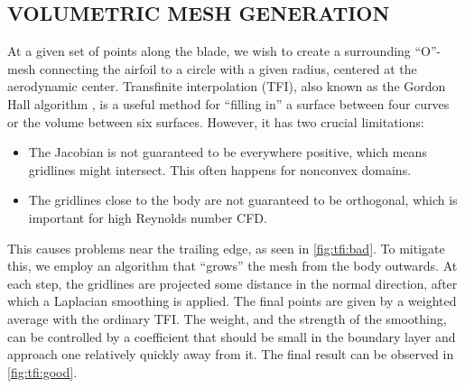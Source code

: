 \documentclass{nordic}
\begin{document}
\subsection{VOLUMETRIC MESH GENERATION}

At a given set of points along the blade, we wish to create a surrounding ``O''-mesh connecting the
airfoil to a circle with a given radius, centered at the aerodynamic center.  Transfinite
interpolation (TFI), also known as the Gordon Hall algorithm \cite{Gordon1973ccc}, is a useful method for
``filling in'' a surface between four curves or the volume between six surfaces.  However, it has
two crucial limitations:

\begin{itemize}
  \item The Jacobian is not guaranteed to be everywhere positive, which means gridlines might
    intersect.  This often happens for nonconvex domains.
  \item The gridlines close to the body are not guaranteed to be orthogonal, which is important for
    high Reynolds number CFD.
\end{itemize}

This causes problems near the trailing edge, as seen in \autoref{fig:tfi:bad}. To mitigate this, we
employ an algorithm that ``grows'' the mesh from the body outwards.  At each step, the gridlines are
projected some distance in the normal direction, after which a Laplacian smoothing is applied. The
final points are given by a weighted average with the ordinary TFI.  The weight, and the strength of
the smoothing, can be controlled by a coefficient that should be small in the boundary layer and
approach one relatively quickly away from it.  The final result can be observed in
\autoref{fig:tfi:good}.
\end{document}
